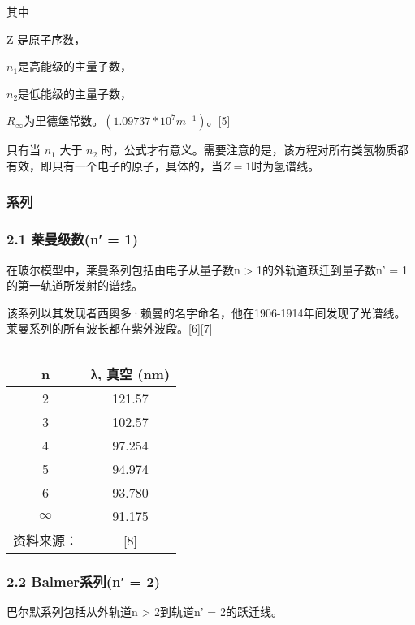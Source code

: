 其中

Z 是原子序数，

$n_1$是高能级的主量子数，

$n_2$是低能级的主量子数，

$R_{\infty}$为里德堡常数。$(1.09737*10^7 m^{-1})$。[5]

只有当 $n_1$  大于 $n_2$   时，公式才有意义。需要注意的是，该方程对所有类氢物质都有效，即只有一个电子的原子，具体的，当$Z=1$时为氢谱线。

\subsubsection{系列}

\subsubsection{2.1 莱曼级数(n′ = 1)}
在玻尔模型中，莱曼系列包括由电子从量子数n > 1的外轨道跃迁到量子数n' = 1的第一轨道所发射的谱线。

该系列以其发现者西奥多·赖曼的名字命名，他在1906-1914年间发现了光谱线。莱曼系列的所有波长都在紫外波段。[6][7]

\begin{table}[ht]
\centering
\caption{}\label{tab_QYZGP1}
\begin{tabular}{|c|c|}
\hline
n & λ, 真空
(nm) \\
\hline
2 & 121.57 \\
\hline
3 &102.57 \\
\hline
4 & 97.254 \\
\hline
5 & 94.974 \\
\hline
6 & 93.780 \\
\hline
$\infty$ &91.175 \\
\hline
资料来源： &[8]\\
\hline
\end{tabular}
\end{table}
\subsubsection{2.2 Balmer系列(n′ = 2)}
巴尔默系列包括从外轨道n > 2到轨道n' = 2的跃迁线。